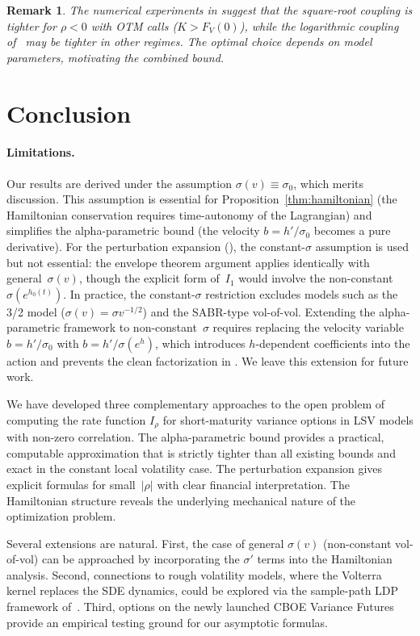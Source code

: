 \documentclass[12pt]{article}
\newtheorem{remark}[theorem]{Remark}
\begin{document}
\begin{remark}
The numerical experiments in  suggest that the square-root
coupling is tighter for $\rho<0$ with OTM calls ($K>F_V(0)$), while the logarithmic
coupling of~\cite{PWZ2025} may be tighter in other regimes. The optimal choice depends
on model parameters, motivating the combined bound.
\end{remark}


\section{Conclusion}

\paragraph{Limitations.}
Our results are derived under the assumption $\sigma(v)\equiv\sigma_0$, which
merits discussion. This assumption is essential for Proposition~\ref{thm:hamiltonian}
(the Hamiltonian conservation requires time-autonomy of the Lagrangian) and simplifies
the alpha-parametric bound (the velocity $b=h'/\sigma_0$ becomes a pure derivative).
For the perturbation expansion (), the constant-$\sigma$ assumption
is used but not essential: the envelope theorem argument applies identically with
general~$\sigma(v)$, though the explicit form of~$I_1$ would involve the non-constant
$\sigma(e^{h_0(t)})$. In practice, the constant-$\sigma$ restriction excludes models
such as the 3/2 model ($\sigma(v)=\sigma v^{-1/2}$) and the SABR-type vol-of-vol.
Extending the alpha-parametric framework to non-constant~$\sigma$ requires replacing
the velocity variable $b=h'/\sigma_0$ with $b=h'/\sigma(e^h)$, which introduces
$h$-dependent coefficients into the action and prevents the clean factorization in
. We leave this extension for future work.

We have developed three complementary approaches to the open problem of computing the
rate function $I_\rho$ for short-maturity variance options in LSV models with non-zero
correlation. The alpha-parametric bound provides a practical, computable approximation
that is strictly tighter than all existing bounds and exact in the constant local
volatility case. The perturbation expansion gives explicit formulas for small~$|\rho|$
with clear financial interpretation. The Hamiltonian structure reveals the underlying
mechanical nature of the optimization problem.

Several extensions are natural. First, the case of general $\sigma(v)$ (non-constant
vol-of-vol) can be approached by incorporating the $\sigma'$ terms into the Hamiltonian
analysis. Second, connections to rough volatility models, where the Volterra kernel
replaces the SDE dynamics, could be explored via the sample-path LDP framework
of~\cite{BayerFriz}. Third, options on the newly launched CBOE Variance Futures provide
an empirical testing ground for our asymptotic formulas.
\end{document}
